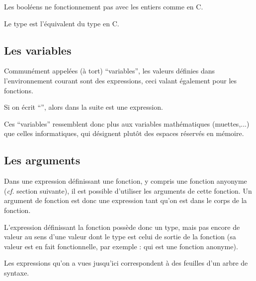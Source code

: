  		\begin{Remarque}
 			Les booléens ne fonctionnement pas avec les entiers comme en C.
 		\end{Remarque}
 		
 		\begin{Remarque}
 			Le type  est l'équivalent du type  en C.
 		\end{Remarque}
 	
 	\subsection{Les variables}
 	
 		Communément appelées (à tort) ``variables'', les valeurs définies dans l'environnement courant sont des expressions, ceci valant également pour les fonctions.
 		
 		\vs{2}
 		\begin{Exemple}
 			Si on écrit ``'', alors dans la suite  est une expression.
 		\end{Exemple}
 		
 		\vs{3}
 		\begin{Remarque}
 			Ces ``variables'' ressemblent donc plus aux variables mathématiques (muettes,...) que celles informatiques, qui désignent plutôt des espaces réservés en mémoire.
 		\end{Remarque}
 	
 	\subsection{Les arguments}
 	
 		Dans une expression définissant une fonction, y compris une fonction anyonyme (\emph{cf.} section suivante), il est possible d'utiliser les arguments de cette fonction. Un argument de fonction est donc une expression tant qu'on est dans le corps de la fonction.
 		
 		\begin{Remarque}
 			L'expression définissant la fonction possède donc un type, mais pas encore de valeur au sens d'une valeur dont le type est celui de sortie de la fonction (sa valeur est en fait fonctionnelle, par exemple :  qui est une fonction anonyme).
 		\end{Remarque}
 	
 		\begin{Remarque}
 			Les expressions qu'on a vues jusqu'ici correspondent à des feuilles d'un arbre de syntaxe.
 		\end{Remarque}
 	
